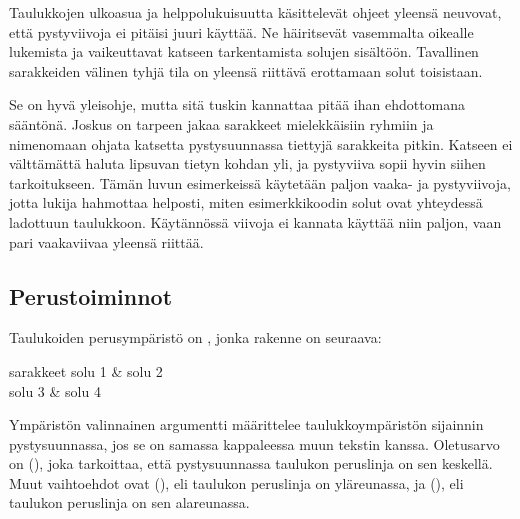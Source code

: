 Taulukkojen ulkoasua ja helppolukuisuutta käsittelevät ohjeet yleensä
neuvovat, että pystyviivoja ei pitäisi juuri käyttää. Ne häiritsevät
vasemmalta oikealle lukemista ja vaikeuttavat katseen tarkentamista
solujen sisältöön. Tavallinen sarakkeiden välinen tyhjä tila on yleensä
riittävä erottamaan solut toisistaan.

Se on hyvä yleisohje, mutta sitä tuskin kannattaa pitää ihan ehdottomana
sääntönä. Joskus on tarpeen jakaa sarakkeet mielekkäisiin ryhmiin ja
nimenomaan ohjata katsetta pystysuunnassa tiettyjä sarakkeita pitkin.
Katseen ei välttämättä haluta lipsuvan tietyn kohdan yli, ja pystyviiva
sopii hyvin siihen tarkoitukseen. Tämän luvun esimerkeissä käytetään
paljon vaaka- ja pystyviivoja, jotta lukija hahmottaa helposti, miten
esimerkkikoodin solut ovat yhteydessä ladottuun taulukkoon. Käytännössä
viivoja ei kannata käyttää niin paljon, vaan pari vaakaviivaa yleensä
riittää.

\subsection{Perustoiminnot}

Taulukoiden perusympäristö on , jonka rakenne on
seuraava:

\komentoi{\keno}
\begin{koodilohkosis}
\begin{tabular}[sijainti]{sarakkeet}
  solu 1 & solu 2 \\
  solu 3 & solu 4 \\
\end{tabular}
\end{koodilohkosis}

Ympäristön valinnainen argumentti  määrittelee
taulukkoympäristön sijainnin pystysuunnassa, jos se on samassa
kappaleessa muun tekstin kanssa. Oletusarvo on 
(), joka tarkoittaa, että pystysuunnassa taulukon
peruslinja on sen keskellä. Muut vaihtoehdot ovat 
(), eli taulukon peruslinja on yläreunassa, ja 
(), eli taulukon peruslinja on sen alareunassa.



